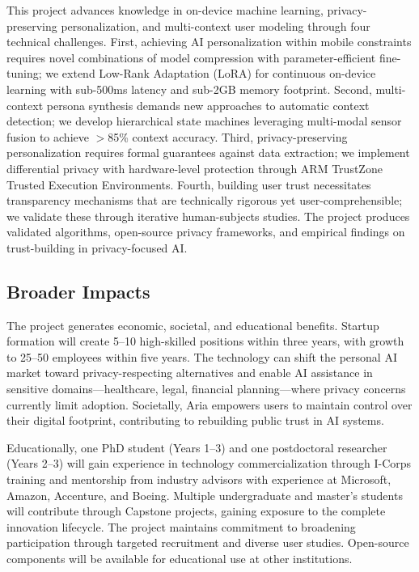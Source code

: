 \documentclass[11pt]{article}
\begin{document}
This project advances knowledge in on-device machine learning, privacy-preserving personalization, and multi-context user modeling through four technical challenges. First, achieving AI personalization within mobile constraints requires novel combinations of model compression with parameter-efficient fine-tuning; we extend Low-Rank Adaptation (LoRA) for continuous on-device learning with sub-500ms latency and sub-2GB memory footprint. Second, multi-context persona synthesis demands new approaches to automatic context detection; we develop hierarchical state machines leveraging multi-modal sensor fusion to achieve $>$85\% context accuracy. Third, privacy-preserving personalization requires formal guarantees against data extraction; we implement differential privacy with hardware-level protection through ARM TrustZone Trusted Execution Environments. Fourth, building user trust necessitates transparency mechanisms that are technically rigorous yet user-comprehensible; we validate these through iterative human-subjects studies. The project produces validated algorithms, open-source privacy frameworks, and empirical findings on trust-building in privacy-focused AI.

\subsection*{Broader Impacts}

The project generates economic, societal, and educational benefits. Startup formation will create 5--10 high-skilled positions within three years, with growth to 25--50 employees within five years. The technology can shift the personal AI market toward privacy-respecting alternatives and enable AI assistance in sensitive domains---healthcare, legal, financial planning---where privacy concerns currently limit adoption. Societally, Aria empowers users to maintain control over their digital footprint, contributing to rebuilding public trust in AI systems.

Educationally, one PhD student (Years 1--3) and one postdoctoral researcher (Years 2--3) will gain experience in technology commercialization through I-Corps training and mentorship from industry advisors with experience at Microsoft, Amazon, Accenture, and Boeing. Multiple undergraduate and master's students will contribute through Capstone projects, gaining exposure to the complete innovation lifecycle. The project maintains commitment to broadening participation through targeted recruitment and diverse user studies. Open-source components will be available for educational use at other institutions.
\end{document}
